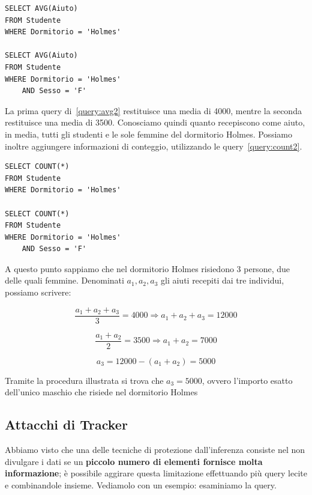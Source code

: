 \begin{algorithm}
\begin{lstlisting}[caption={Query di Media per ottenere informazioni sugli studenti del dormitorio Holmes \label{query:avg2}}] 
SELECT AVG(Aiuto)
FROM Studente
WHERE Dormitorio = 'Holmes'

SELECT AVG(Aiuto)
FROM Studente
WHERE Dormitorio = 'Holmes'
	AND Sesso = 'F'
\end{lstlisting}
\end{algorithm}

La prima query di~\ref{query:avg2} restituisce una media di 4000, mentre la seconda restituisce una media di 3500. Conosciamo quindi quanto recepiscono come aiuto, in media, tutti gli studenti e le sole femmine del dormitorio Holmes. Possiamo inoltre aggiungere informazioni di conteggio, utilizzando le query~\ref{query:count2}.

\begin{algorithm}
\begin{lstlisting}[caption={Query di conteggio per ottenere informazioni sugli studenti del dormitorio Holmes \label{query:count2}}]
SELECT COUNT(*)
FROM Studente
WHERE Dormitorio = 'Holmes'

SELECT COUNT(*)
FROM Studente
WHERE Dormitorio = 'Holmes'
	AND Sesso = 'F'
\end{lstlisting}
\end{algorithm}

A questo punto sappiamo che nel dormitorio Holmes risiedono 3 persone, due delle quali femmine. Denominati $a_1,a_2,a_3$ gli aiuti recepiti dai tre individui, possiamo scrivere:

\begin{equation}
\frac{a_1 + a_2 + a_3}{3} = 4000 \Rightarrow a_1 + a_2 + a_3 = 12000
\end{equation}

\begin{equation}
\frac{a_1 + a_2}{2} = 3500 \Rightarrow a_1 + a_2 = 7000
\end{equation}

\begin{equation}
 a_3 = 12000 - (a_1 + a_2) = 5000
\end{equation}

Tramite la procedura illustrata si trova che $ a_{3} = 5000 $, ovvero l'importo esatto dell'unico maschio che risiede nel dormitorio Holmes

\subsection{Attacchi di Tracker}
Abbiamo visto che una delle tecniche di protezione dall'inferenza consiste nel non divulgare i dati se un \textbf{piccolo numero di elementi fornisce molta informazione}; è possibile aggirare questa limitazione effettuando più query lecite e combinandole insieme. Vediamolo con un esempio: esaminiamo la query.

